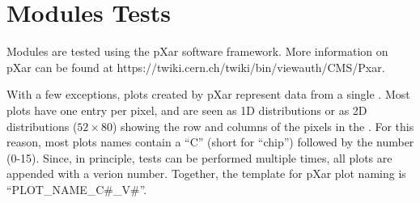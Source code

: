 \section{Modules Tests}
\label{s:tests}

Modules are tested using the pXar software framework.  
More information on pXar can be found at https://twiki.cern.ch/twiki/bin/viewauth/CMS/Pxar.

With a few exceptions, plots created by pXar represent data from a single \roc.
Most \roc plots have one entry per pixel, and are seen as 1D distributions
or as 2D distributions ($52\times80$) showing the row and columns of the pixels in the \roc.
For this reason, most plots names contain a ``C'' (short for ``chip'') followed by the  \roc number (0-15).
Since, in principle, tests can be performed multiple times, all plots are appended with a verion number.
Together, the template for pXar plot naming is ``PLOT\_NAME\_C\#\_V\#''.




















